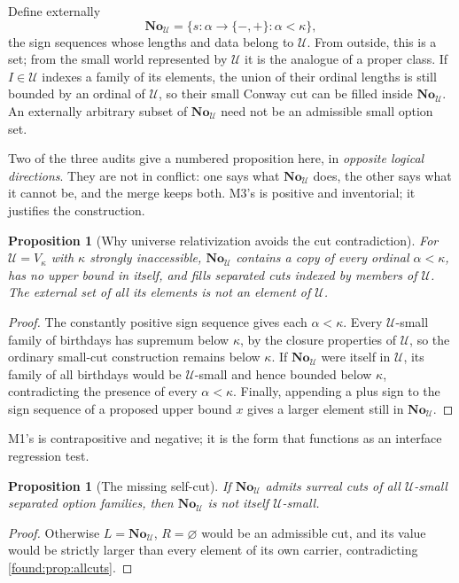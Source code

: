 \documentclass[11pt,letterpaper]{article}
\numberwithin{equation}{section}
\newtheorem{proposition}[theorem]{Proposition}
\theoremstyle{definition}
\theoremstyle{remark}
\newcommand{\No}{\mathbf{No}}
\newcommand{\U}{\mathcal U}
\begin{document}
Define externally
\begin{equation}\label{found:eq:NoU}
 \No_\U=\{s:\alpha\to\{-,+\}:\alpha<\kappa\},
\end{equation}
the sign sequences whose lengths and data belong to $\U$. From outside, this is
a set; from the small world represented by $\U$ it is the analogue of a proper
class. If $I\in\U$ indexes a family of its elements, the union of their ordinal
lengths is still bounded by an ordinal of $\U$, so their small Conway cut can be
filled inside $\No_\U$. An externally arbitrary subset of $\No_\U$ need not be
an admissible small option set.

Two of the three audits give a numbered proposition here, in \emph{opposite
logical directions}. They are not in conflict: one says what $\No_\U$ does, the
other says what it cannot be, and the merge keeps both. M3's is positive and
inventorial; it justifies the construction.

\begin{proposition}[Why universe relativization avoids the cut contradiction]\label{found:prop:universe}
For $\U=V_\kappa$ with $\kappa$ strongly inaccessible, $\No_\U$ contains a copy
of every ordinal $\alpha<\kappa$, has no upper bound in itself, and fills
separated cuts indexed by members of $\U$. The external set of all its elements
is not an element of $\U$.
\end{proposition}
\begin{proof}
The constantly positive sign sequence gives each $\alpha<\kappa$. Every
$\U$-small family of birthdays has supremum below $\kappa$, by the closure
properties of $\U$, so the ordinary small-cut construction remains below
$\kappa$. If $\No_\U$ were itself in $\U$, its family of all birthdays would be
$\U$-small and hence bounded below $\kappa$, contradicting the presence of
every $\alpha<\kappa$. Finally, appending a plus sign to the sign sequence of a
proposed upper bound $x$ gives a larger element still in $\No_\U$.
\end{proof}

M1's is contrapositive and negative; it is the form that functions as an
interface regression test.

\begin{proposition}[The missing self-cut]\label{found:prop:universecut}
If $\No_\U$ admits surreal cuts of all $\U$-small separated option families,
then $\No_\U$ is not itself $\U$-small.
\end{proposition}
\begin{proof}
Otherwise $L=\No_\U$, $R=\varnothing$ would be an admissible cut, and its value
would be strictly larger than every element of its own carrier, contradicting
\cref{found:prop:allcuts}.
\end{proof}
\end{document}
